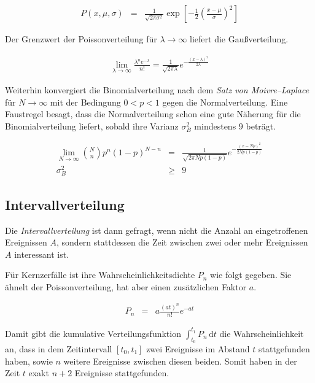 \documentclass[12pt,a4paper]{scrartcl}
\numberwithin{equation}{section} %
\begin{document}
\begin{eqnarray}
	P(x,\mu,\sigma) &=& \frac{1}{\sqrt{2 \pi\sigma^2}} \exp\left[- \frac{1}{2} \left(\frac{x - \mu}{\sigma}\right)^2\right]
\end{eqnarray}

\noindent
Der Grenzwert der Poissonverteilung für $\lambda \rightarrow \infty$ liefert die Gaußverteilung.

\begin{eqnarray}
	\lim_{\lambda \rightarrow \infty} \frac{\lambda^n e^{-\lambda}}{n!} = \frac{1}{\sqrt{2 \pi \lambda}} e^{- \frac{(x-\lambda)^2}{2\lambda}}
\end{eqnarray}

\noindent
Weiterhin konvergiert die Binomialverteilung nach dem \emph{Satz von Moivre--Laplace} für $N \rightarrow \infty$ mit der Bedingung $0 < p < 1$ gegen die Normalverteilung. Eine Faustregel besagt, dass die Normalverteilung schon eine gute Näherung für die Binomialverteilung liefert, sobald ihre Varianz $\sigma^2_B$ mindestens $9$ beträgt.

\begin{eqnarray}
	\lim_{N \rightarrow \infty} \binom{N}{n} p^n (1-p)^{N-n}
		&=& \frac{1}{\sqrt{2 \pi N p (1-p)}} e^{- \frac{(x - Np)^2}{2 N p (1-p)}} \\
	\sigma^2_B &\geq& 9
\end{eqnarray}

\hypertarget{Intervallverteilung}{\subsection{Intervallverteilung}\label{Intervallverteilung}}
Die \emph{Intervallverteilung} ist dann gefragt, wenn nicht die Anzahl an eingetroffenen Ereignissen $A$, sondern stattdessen die Zeit zwischen zwei oder mehr Ereignissen $A$ interessant ist.

Für Kernzerfälle ist ihre Wahrscheinlichkeitsdichte $P_n$ wie folgt gegeben. Sie ähnelt der Poissonverteilung, hat aber einen zusätzlichen Faktor $a$.

\begin{eqnarray}
	P_n &=& a \frac{(at)^n}{n!} e^{-at} \label{eq:Intervallverteilung}
\end{eqnarray}

\noindent
Damit gibt die kumulative Verteilungsfunktion $\int_{t_0}^{t_1} P_n \,\mathrm dt \label{eq:P_n_int}$ die Wahrscheinlichkeit an, dass in dem Zeitintervall $[t_0,t_1]$ zwei Ereignisse im Abstand $t$ stattgefunden haben, sowie $n$ weitere Ereignisse zwischen diesen beiden. Somit haben in der Zeit $t$ exakt $n+2$ Ereignisse stattgefunden.
\end{document}
